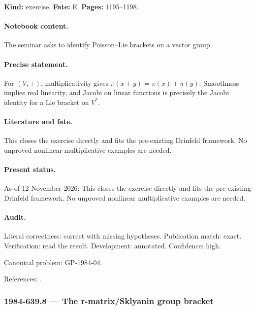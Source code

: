 \noindent\textbf{Kind:} exercise. \textbf{Fate:} E. \textbf{Pages:} 1195--1198.\par

\paragraph{Notebook content.} The seminar asks to identify Poisson--Lie brackets on a vector group.

\paragraph{Precise statement.} For \((V,+)\), multiplicativity gives \(\pi(x+y)=\pi(x)+\pi(y)\). Smoothness implies real linearity, and Jacobi on linear functions is precisely the Jacobi identity for a Lie bracket on \(V^*\).

\paragraph{Literature and fate.} This closes the exercise directly and fits the pre-existing Drinfeld framework. No unproved nonlinear multiplicative examples are needed.

\paragraph{Present status.} As of 12 November 2026: This closes the exercise directly and fits the pre-existing Drinfeld framework. No unproved nonlinear multiplicative examples are needed.

\paragraph{Audit.} Literal correctness: correct with missing hypotheses. Publication match: exact. Verification: read the result. Development: annotated. Confidence: high.

\noindent Canonical problem: GP-1984-04.\par

\noindent References: \citep{drinfeld1983hamiltonian}.\par

\subsubsection{1984-639.8 --- The r-matrix/Sklyanin group bracket}

\label{item:1984-639.8}


